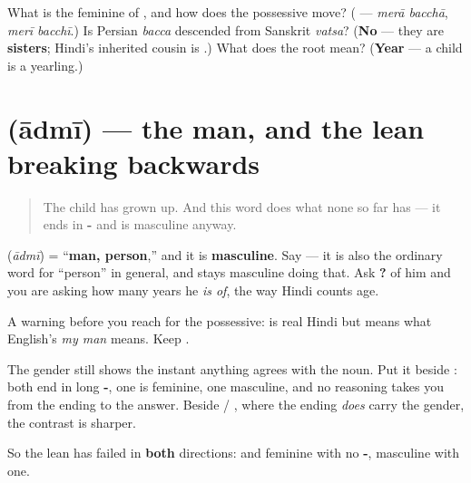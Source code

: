 \begin{tcolorbox}[breakable,colback=teal!4,colframe=teal!35!black,title={Before you move on}]
What is the feminine of \textbf{}, and how does the possessive move? (\textbf{} — \emph{merā bacchā}, \emph{merī bacchī}.) Is Persian \emph{bacca} descended from Sanskrit \emph{vatsa}? (\textbf{No} — they are \textbf{sisters}; Hindi's inherited cousin is \textbf{}.) What does the root mean? (\textbf{Year} — a child is a yearling.)
\end{tcolorbox}
\section[\texorpdfstring{\hi{आदमी} (ādmī)}{आदमी (ādmī)}]{ (ādmī) — the man, and the lean breaking backwards}

\label{lesson:HI-C39-aadmi}



\begin{quote}
The child has grown up. And this word does what none so far has — it ends in \textbf{-} and is masculine anyway.
\end{quote}

\begin{grammarlens}[title={Grammar Lens: the lean breaks the other way}]
\textbf{} (\emph{ādmī}) = \textquotedblleft{}\textbf{man, person},\textquotedblright{} and it is \textbf{masculine}. Say \textbf{ } — it is also the ordinary word for \textquotedblleft{}person\textquotedblright{} in general, and stays masculine doing that. Ask \textbf{   ?} of him and you are asking how many years he \emph{is of}, the way Hindi counts age.

A warning before you reach for the possessive: \textbf{ } is real Hindi but means what English's \emph{my man} means. Keep \textbf{ }.

The gender still shows the instant anything agrees with the noun. Put it beside \textbf{}: both end in long \textbf{-}, one is feminine, one masculine, and no reasoning takes you from the ending to the answer. Beside \textbf{} / \textbf{}, where the ending \emph{does} carry the gender, the contrast is sharper.

So the lean has failed in \textbf{both} directions: \textbf{} and \textbf{} feminine with no \textbf{-}, \textbf{} masculine with one.
\end{grammarlens}

